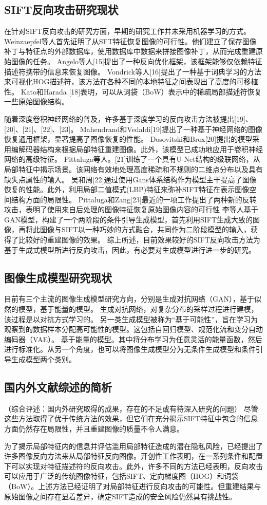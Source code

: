 \subsection{SIFT反向攻击研究现状}
在针对SIFT反向攻击的研究方面，早期的研究工作并未采用机器学习的方式。
Weinzaepfel等人\cite{5995616}首先证明了从SFT特征恢复图像的可行性。他们建立了保存图像补丁与特征点的外部数据库，使用数据库中数据来拼接图像补丁，从而完成重建原始图像的任务。
Angelo等人[15]提出了一种反向优化框架，该框架能够仅依赖特征描述符携带的信息来恢复图像。
Vondrick等人[16]提出了一种基于词典学习的方法来可视化HOG描述符，该方法在各种不同的本地特征之间表现出了高度的可移植性。
Kato和Harada [18]表明，可以从词袋（BoW）表示中的稀疏局部描述符恢复一些原始图像结构。
\par
随着深度卷积神经网络的普及，许多基于深度学习的反向攻击方法被提出[19]、[20]、[21]、[22]、[23]。
Mahendrand和Vedaldi[19]提出了一种基于神经网络的图像恢复通用框架，显著提高了图像恢复的性能。
Dosovitski和Brox[20]提出的模型采用编解码器结构来根据局部特征重建图像。此外，该模型已成功地应用于卷积神经网络的高级特征。
Pittaluga等人。[21]训练了一个具有U-Net结构的级联网络，从局部特征中揭示场景。该网络有效地处理高度稀疏和不规则的二维点分布以及具有缺失点属性的输入。
吴和周[22]通过使用Gans体系结构作为模型主干提高了图像恢复的性能。此外，利用局部二值模式(LBP)特征来弥补SIFT特征在表示图像空间结构方面的局限性。
Pittaluga和Zang[23]最近的一项工作提出了两种新的反转攻击，表明了使用来自后处理的图像特征恢复原始图像内容的可行性
李等人基于GAN模型，构建了一个两阶段的条件引导生成模型，首先利用SIFT生成大致的图像，再将此图像与SIFT以一种巧妙的方式融合，共同作为二阶段模型的输入，获得了比较好的重建图像的效果。
综上所述，目前效果较好的SIFT反向攻击方法为基于生成式模型所进行反向攻击，因此，有必要对生成模型进行进一步的研究。
\subsection{图像生成模型研究现状}
目前有三个主流的图像生成模型研究方向，分别是生成对抗网络（GAN），基于似然的模型，基于能量的模型。\cite{luoUnderstandingDiffusionModels2022}
生成对抗网络，对复杂分布的采样过程进行建模，该过程是以对抗方式学习的。
另一类生成模型被称为“基于可能性”，旨在学习为观察到的数据样本分配高可能性的模型。这包括自回归模型、规范化流和变分自动编码器（VAE）。
基于能量的模型。其中将分布学习为任意灵活的能量函数，然后进行标准化。从另一个角度，也可以将图像生成模型分为无条件生成模型和条件引导生成模型两个类别。
\subsection{国内外文献综述的简析}
（综合评述：国内外研究取得的成果，存在的不足或有待深入研究的问题）
尽管这些方法取得了优于传统方法的效果，但它们在充分揭示SIFT特征中包含的信息方面仍然存在局限性，并且重建图像的质量不令人满意。
\par 为了揭示局部特征内的信息并评估滥用局部特征造成的潜在隐私风险，已经提出了许多图像反向方法来从局部特征反向图像。开创性工作表明，在一系列条件和配置下可以实现对特征描述符的反向攻击。此外，许多不同的方法已经表明，反向攻击可以应用于广泛的传统图像特征，包括SIFT、定向梯度图（HOG）和词袋（BoW）。上述方法已经证明了对局部特征进行反向攻击的可能性。但重建结果与原始图像之间存在显着差异，确定SIFT造成的安全风险仍然具有挑战性。
